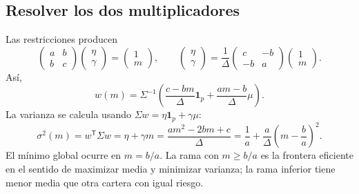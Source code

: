 \documentclass[11pt,a4paper]{article}
\newcommand{\T}{^{\mathsf T}}
\newcommand{\ones}{\mathbf 1}
\theoremstyle{definition}
\begin{document}
\subsection{Resolver los dos multiplicadores}
Las restricciones producen
\[
\begin{pmatrix}a&b\\b&c\end{pmatrix}\begin{pmatrix}\eta\\\gamma\end{pmatrix}
=\begin{pmatrix}1\\m\end{pmatrix},\qquad
\begin{pmatrix}\eta\\\gamma\end{pmatrix}
=\frac1\Delta\begin{pmatrix}c&-b\\-b&a\end{pmatrix}\begin{pmatrix}1\\m\end{pmatrix}.
\]
Así,
\[
\boxed{w(m)=\Sigma^{-1}\left(\frac{c-bm}{\Delta}\ones_p+\frac{am-b}{\Delta}\mu\right)}.
\]
La varianza se calcula usando $\Sigma w=\eta\ones_p+\gamma\mu$:
\[
\sigma^2(m)=w\T\Sigma w=\eta+\gamma m
=\frac{am^2-2bm+c}{\Delta}
=\boxed{\frac1a+\frac a\Delta\left(m-\frac ba\right)^2}.
\]
El mínimo global ocurre en $m=b/a$. La rama con $m\ge b/a$ es la frontera eficiente en el sentido de maximizar media y minimizar varianza; la rama inferior tiene menor media que otra cartera con igual riesgo.
\end{document}
